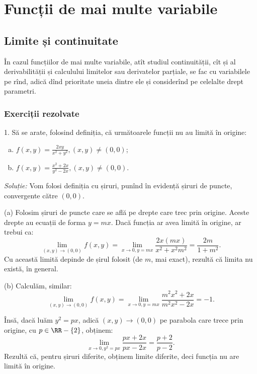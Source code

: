 \chapter{Funcții de mai multe variabile}

\section{Limite și continuitate}

În cazul funcțiilor de mai multe variabile, atît studiul continuității,
cît și al derivabilității și calculului limitelor sau derivatelor
parțiale, se fac cu variabilele pe rînd, adică dînd prioritate
uneia dintre ele și considerînd pe celelalte drept parametri.

\subsection{Exerciții rezolvate}

1. Să se arate, folosind definiția, că următoarele funcții nu au limită în origine:
\begin{enumerate}[(a)]
\item $f(x, y) = \frac{2xy}{x^2 + y^2}, (x, y) \neq (0, 0)$;
\item $f(x, y) = \frac{x^2 + 2x}{y^2 - 2x}, (x, y) \neq (0, 0)$.
\end{enumerate}

\emph{Soluție:} Vom folosi definiția cu șiruri, punînd în evidență șiruri de puncte,
convergente către $(0, 0)$.

(a) Folosim șiruri de puncte care se află pe drepte care trec prin origine. Aceste drepte
au ecuații de forma $y = mx$. Dacă funcția ar avea limită în origine, ar trebui ca:
\[
  \lim_{(x, y) \to (0, 0)} f(x, y) = \lim_{x \to 0, y = mx} \frac{2x(mx)}{x^2 + x^2 m^2} = %
  \frac{2m}{1 + m^2}.
\]
Cu această limită depinde de șirul folosit (de $m$, mai exact), rezultă că limita nu
există, în general.

(b) Calculăm, similar:
\[
  \lim_{(x, y) \to (0, 0)} f(x, y) = %
  \lim_{x \to 0, y = mx} \frac{m^2 x^2 + 2x}{m^2 x^2 - 2x} = -1.
\]

Însă, dacă luăm $y^2 = px$, adică $(x, y) \to (0, 0)$ pe parabola care trece prin origine,
cu $p \in \RR - \{2 \}$, obținem:
\[
  \lim_{x \to 0, y^2 = px} \frac{px + 2x}{px - 2x} = \frac{p + 2}{p - 2}.
\]
Rezultă că, pentru șiruri diferite, obținem limite diferite, deci funcția nu are limită
în origine.

\vspace{1cm}

